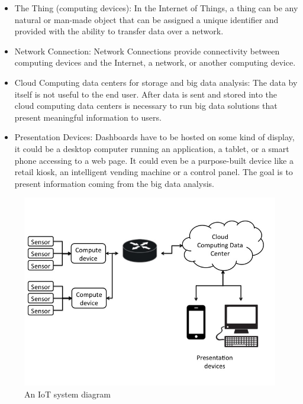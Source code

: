 \begin{itemize} 

\item The Thing (computing devices): In the Internet of Things, a thing can be
any natural or man-made object that can be assigned a unique identifier and
provided with the ability to transfer data over a network. 

\item Network Connection: Network Connections provide connectivity between
computing devices and the Internet, a network, or another computing device. 

\item Cloud Computing data centers for storage and big data analysis: The data
by itself is not useful to the end user. After data is sent and stored into the
cloud computing data centers is necessary to run big data solutions that
present meaningful information to users. 

\item Presentation Devices: Dashboards have to be hosted on some kind of
display, it could be a desktop computer running an application, a tablet, or a
smart phone accessing to a web page. It could even be a purpose-built device
like a retail kiosk, an intelligent vending machine or a control panel. The
goal is to present information coming from the big data analysis. 

\end{itemize}

\begin{figure}[H] \centering
\includegraphics[width=1\textwidth]{images/IoT_diagram.jpg} \caption{An IoT
system diagram } \label{fig:1.1} \end{figure}

